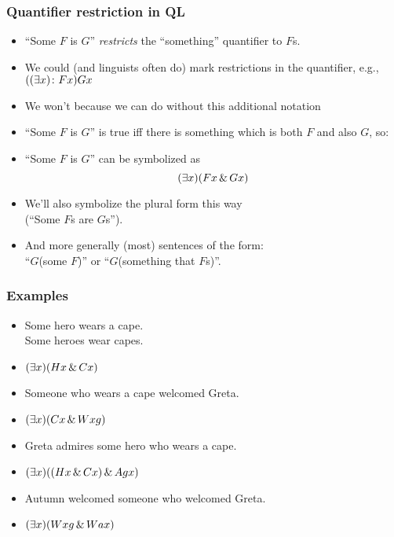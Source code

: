 \begin{frame}
\frametitle{Quantifier restriction in QL}

\begin{itemize}[<+->]
  \item ``Some $F$ is $G$'' \emph{restricts} the ``something''
  quantifier to $F$s.
  \item We could (and linguists often do) mark restrictions in the
  quantifier, e.g., $((\exists x)\colon Fx) Gx$
  \item We won't because we can do without this additional notation
  \item ``Some $F$ is $G$'' is true iff there is something which
  is both $F$ and also $G$, so:
  \item ``Some $F$ is $G$'' can be symbolized as
  \[ (\exists x)(Fx \,\&\, Gx) \]
  \item We'll also symbolize the plural form this way\\ (``Some $F$s are
  $G$s'').
  \item And more generally (most) sentences of the form:\\
  ``$G$(some $F$)'' or ``$G$(something that $F$s)''.
\end{itemize}
\end{frame}

\begin{frame}
\frametitle{Examples}

\begin{itemize}[<+->]
  \item \alert{Some hero} wears a cape.\\
  \alert{Some heroes} wear capes.\\
  \item[] \alert{$(\exists x)(Hx \,\&\, Cx)$}
  \item \alert{Someone who wears a cape} welcomed Greta.\\
  \item[] \alert{$(\exists x)(Cx \,\&\, Wxg)$}
  \item Greta admires \alert{some hero who wears a cape}.
  \item[] \alert{$(\exists x)((Hx \,\&\, Cx) \,\&\, Agx)$}
  \item Autumn welcomed \alert{someone who welcomed Greta}.
  \item[] \alert{$(\exists x)(Wxg \,\&\, Wax)$}
\end{itemize}
\end{frame}

